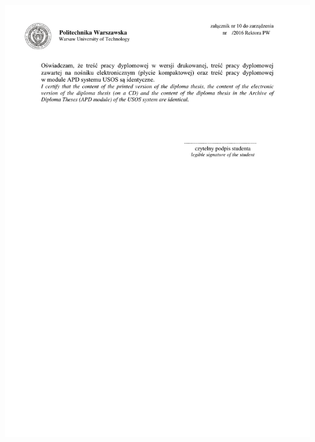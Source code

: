 \documentclass[
    bindingoffset=5mm,  %
    footnoteindent=3mm, %
    hyphenation=true    %
]{src/wut-thesis}
\begin{document}
\includegraphics[width=\textwidth]{src/en/authorship/eiti-2.pdf}

\cleardoublepage %
\tableofcontents

\cleardoublepage %
\pagestyle{headings}




\clearpage %
\end{document}
